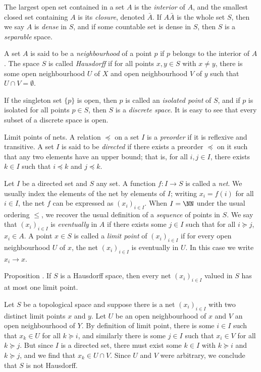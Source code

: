 The largest
open set contained in a set $A$ is the {\it interior} of $A$, and the smallest closed set containing
$A$ is its {\it closure}, denoted $\bar A$. If $A\bar A$ is the whole set $S$, then we say $A$ is
{\it dense} in $S$, and if some countable set is dense in $S$, then $S$ is a {\it separable} space.

A set $A$ is said to be a {\it neighbourhood} of a point $p$ if $p$ belongs to the interior of $A$.
The space $S$ is called {\it Hausdorff} if for all points $x,y\in S$ with $x\ne y$, there is some
open neighbourhood $U$ of $X$ and open neighbourhood $V$ of $y$ such that $U\cap V=\emptyset$.

If the singleton set $\{p\}$ is open, then $p$ is called an {\it isolated point} of $S$, and if
$p$ is isolated for all points $p\in S$, then $S$ is a {\it discrete space}. It is easy to see
that every subset of a discrete space is open.

\medskip\boldlabel Limit points of nets.
A relation $\preceq$ on a set $I$ is a {\it preorder} if it is reflexive and transitive.
A set $I$ is said to be {\it directed} if there exists a preorder $\preceq$ on it such that
any two elements have an upper bound; that is,
for all $i,j\in I$, there exists $k\in I$ such that $i\preceq k$ and $j\preceq k$.

Let $I$ be a directed set and $S$ any set. A function $f:I\to S$ is called
a {\it net}. We usually index the elements of the net by elements of $I$; writing $x_i = f(i)$ for all
$i\in I$, the net $f$ can be expressed as $(x_i)_{i\in I}$. When $I = \NN$ under the usual ordering
$\le$, we recover the usual definition of a {\it sequence} of points in $S$.
We say that $(x_i)_{i\in I}$ is {\it eventually} in $A$ if there exists some $j\in I$ such that for all
$i \succeq j$, $x_i\in A$. A point $x\in S$ is called a {\it limit point} of $(x_i)_{i\in I}$ if
for every open neighbourhood $U$ of $x$, the net $(x_i)_{i\in I}$ is eventually in $U$. In this
case we write $x_i\to x$.

\proclaim Proposition \advthm. If $S$ is a Hausdorff space, then every net $(x_i)_{i\in I}$ valued
in $S$ has at most one limit point.

\proof Let $S$ be a topological space and suppose there is a net $(x_i)_{i\in I}$ with two distinct
limit points $x$ and $y$. Let $U$ be an open neighbourhood of $x$ and $V$ an open neighbourhood of $Y$.
By definition of limit point, there is some $i\in I$ such that $x_k \in U$ for all $k\succeq i$,
and similarly there is some $j\in I$ such that $x_i\in V$ for all $k\succeq j$. But since $I$
is a directed set, there must exist some $k\in I$ with $k\succeq i$ and $k\succeq j$, and we find
that $x_k\in U\cap V$. Since $U$ and $V$ were arbitrary, we conclude that $S$ is not Hausdorff.\slug

